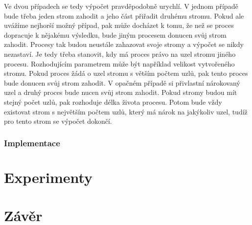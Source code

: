 \documentclass[a4paper, 11pt, titlepage, final]{article}[3. prosinec 2011]
\begin{document}
Ve dvou případech se tedy výpočet pravděpodobně urychlí. V jednom případě bude třeba jeden strom zahodit a jeho část přiřadit druhému stromu. Pokud ale uvážíme nejhorší možný případ, pak může docházet k tomu, že než se proces dopracuje k nějakému výsledku, bude jiným procesem donucen svůj strom zahodit. Procesy tak budou neustále zahazovat svoje stromy a výpočet se nikdy nezastaví. Je tedy třeba stanovit, kdy má proces právo na uzel stromu jiného procesu. Rozhodujícím parametrem může být například velikost vytvořeného stromu. Pokud proces žádá o uzel stromu s větším počtem uzlů, pak tento proces bude donucen svůj strom zahodit. V opačném případě si přivlastní nárokovaný uzel a druhý proces bude nucen svůj strom zahodit. Pokud stromy budou mít stejný počet uzlů, pak rozhoduje délka života procesu. Potom bude vždy existovat strom s největším počtem uzlů, který má nárok na jakýkoliv uzel, tudíž pro tento strom se výpočet dokončí.


\subsubsection*{Implementace}

\section{Experimenty}

\section{Závěr}

\end{document}
